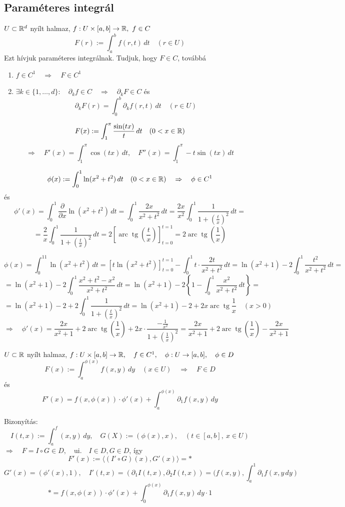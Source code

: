 \documentclass[a4paper,11.5pt]{article}
\DeclareMathOperator{\tg}{tg}
\DeclareMathOperator{\arc}{arc}
\begin{document}
	\subsection{Paraméteres integrál}
	\begin{revision}
		$U\subset\mathbb{R}^d$ nyílt halmaz, $f:U\times[a,b]\to\mathbb{R},\ f\in C$
		\[ F(r):=\int_{a}^{b}f(r,t)\,dt\quad (r\in U) \]
		Ezt hívjuk paraméteres integrálnak. Tudjuk, hogy $F\in C$, továbbá
		\begin{enumerate}
			\item $f\in C^1\quad \Rightarrow\quad F\in C^1$
			\item $\exists k\in\{1,\ldots,d\}:\quad \partial_k f\in C\quad \Rightarrow\quad \partial_k F\in C$ és 
			\[ \partial_k F(r)=\int_0^b \partial_k f(r,t)\,dt\quad (r\in U) \]
		\end{enumerate}
	\end{revision}
	\begin{example}
		\[ F(x):=\int_1^\pi \frac{\sin(tx)}{t}\,dt\quad (0<x\in\mathbb{R}) \]
		\[ \Rightarrow\quad F'(x)=\int_1^\pi\cos(tx)\,dt,\quad F''(x)=\int_1^\pi -t\sin(tx)\,dt \]
	\end{example}
	\begin{example}
		$$\phi(x):=\int_0^1\ln(x^2+t^2)\,dt\quad (0<x\in\mathbb{R})\quad \Rightarrow\quad \phi\in C^1$$ és $$\phi'(x)=\int_0^1\frac{\partial}{\partial x}\ln(x^2+t^2)\,dt=\int_0^1\frac{2x}{x^2+t^2}\,dt=\frac{2x}{x^2}\int_0^1\frac{1}{1+\left(\frac{t}{x}\right)^2}\,dt=$$
		$$=\frac{2}{x}\int_0^1\frac{1}{1+\left(\frac{t}{x}\right)^2}\,dt=2\left[\arc\tg\left(\frac{t}{x}\right)\right]_{t=0}^{t=1}=2\arc\tg\left(\frac{1}{x}\right)$$
	\end{example}
	\begin{note}
		$$\phi(x)=\int_0^11\ln(x^2+t^2)\,dt=[t\ln(x^2+t^2)]_{t=0}^{t=1}-\int_0^1t\cdot\frac{2t}{x^2+t^2}\,dt=\ln(x^2+1)-2\int_0^1\frac{t^2}{x^2+t^2}\,dt=$$
		$$=\ln(x^2+1)-2\int_0^1\frac{x^2+t^2-x^2}{x^2+t^2}\,dt=\ln(x^2+1)-2\left\{ 1-\int_0^1\frac{x^2}{x^2+t^2}\,dt \right\}=$$ $$=\ln(x^2+1)-2+2\int_0^1\frac{1}{1+\left(\frac{t}{x}\right)^2}\,dt=\ln(x^2+1)-2+2x\arc\tg\frac{1}{x}\quad (x>0)$$
		$$\Rightarrow\quad \phi'(x)=\frac{2x}{x^2+1}+2\arc\tg\left(\frac{1}{x}\right)+2x\cdot\frac{-\frac{1}{x^2}}{1+\left(\frac{1}{x}\right)^2}=\frac{2x}{x^2+1}+2\arc\tg\left(\frac{1}{x}\right)-\frac{2x}{x^2+1}$$
	\end{note}
	\begin{theorem}
		$U\subset\mathbb{R}$ nyílt halmaz, $f:U\times[a,b]\to\mathbb{R},\quad f\in C^1,\quad \phi:U\to[a,b],\quad \phi\in D$
		\[ F(x):=\int_a^{\phi(x)}f(x,y)\,dy\quad (x\in U)\quad \Rightarrow\quad F\in D \]
		és
		\[ F'(x)=f(x,\phi(x))\cdot\phi'(x)+\int_a^{\phi(x)}\partial_1 f(x,y)\,dy \]
		
		Bizonyítás: 
		\[ I(t,x):=\int_a^f(x,y) \,dy,\quad G(X):=(\phi(x),x),\quad (t\in[a,b],\ x\in U) \]
		$ \Rightarrow\quad F=I\circ G\in D,\quad \text{ui.}\quad I\in D, G\in D$, így
		\[ F'(x):=\langle (I'\circ G)(x),G'(x)\rangle=* \]
		\[ G'(x)=(\phi'(x),1),\quad I'(t,x)=(\partial_1I(t,x),\partial_2I(t,x))=(f(x,y),\int_a^1\partial_1f\left(x,y\,dy\right) \]
		\[ *=f(x,\phi(x))\cdot \phi'(x)+\int_0^{\phi(x)}\partial_1f(x,y)\,dy\cdot1 \]
	\end{theorem}
\end{document}
